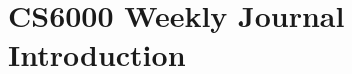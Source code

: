 %
%
%
\section{CS6000 Weekly Journal Introduction}
\usepackage{graphicx}
\usepackage{amssymb}
\usepackage{amsmath}
\usepackage{mathtools}
\usepackage{commath}




%
%






